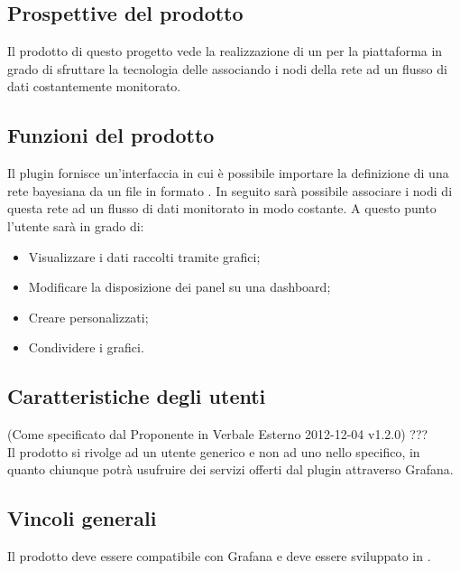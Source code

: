 
\subsection{Prospettive del prodotto}
Il prodotto di questo progetto vede la realizzazione di un  per la piattaforma  in grado di sfruttare la tecnologia delle  associando i nodi della rete ad un flusso di dati costantemente monitorato.

\subsection{Funzioni del prodotto}
Il plugin fornisce un'interfaccia in cui è possibile importare la definizione di una rete bayesiana da un file in formato . In seguito sarà possibile associare i nodi di questa rete ad un flusso di dati monitorato in modo costante. A questo punto l'utente sarà in grado di:
\begin{itemize}
	\item Visualizzare i dati raccolti tramite grafici;
	\item Modificare la disposizione dei panel su una dashboard;
	\item Creare  personalizzati;
	\item Condividere i grafici.
\end{itemize}

\subsection{Caratteristiche degli utenti}
(Come specificato dal Proponente in Verbale Esterno 2012-12-04 v1.2.0) ??? \\
Il prodotto si rivolge ad un utente generico e non ad uno nello specifico, in quanto chiunque potrà usufruire dei servizi offerti dal plugin attraverso Grafana. 

\subsection{Vincoli generali}
Il prodotto deve essere compatibile con Grafana e deve essere sviluppato in .

\pagebreak